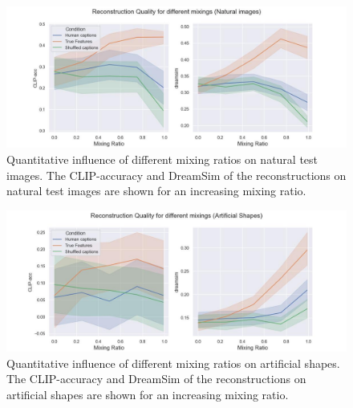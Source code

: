 \begin{figure}[H]
   \centering
   \includegraphics[width=1\textwidth]{plots/aicap_reconstruction_quant_evolution_test.JPEG}
   \caption[Quantitative influence of different mixing ratios on natural test images]{Quantitative influence of different mixing ratios on natural test images. The CLIP-accuracy and DreamSim of the reconstructions on natural test images are shown for an increasing mixing ratio.}\label{fig:aicap_reconstruction_quant_evolution_test}
\end{figure}

\begin{figure}[H]
   \centering
   \includegraphics[width=1\textwidth]{plots/aicap_reconstruction_quant_evolution_art.JPEG}
   \caption[Quantitative influence of different mixing ratios on artificial shapes]{Quantitative influence of different mixing ratios on artificial shapes. The CLIP-accuracy and DreamSim of the reconstructions on artificial shapes are shown for an increasing mixing ratio.}\label{fig:aicap_reconstruction_quant_evolution_art}
\end{figure}

